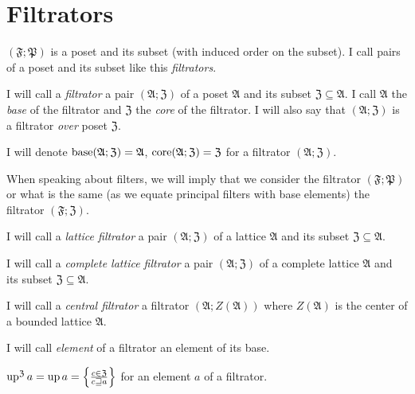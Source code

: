 \section{Filtrators}

$(\mathfrak{F};\mathfrak{P})$ is a poset and its subset (with induced
order on the subset). I call pairs of a poset and its subset like
this \emph{filtrators}.
\begin{defn}
I will call a \emph{filtrator} a pair $(\mathfrak{A};\mathfrak{Z})$
of a poset $\mathfrak{A}$ and its subset $\mathfrak{Z}\subseteq\mathfrak{A}$.
I call $\mathfrak{A}$ the \emph{base} of the filtrator and $\mathfrak{Z}$
the \emph{core} of the filtrator. I will also say that $(\mathfrak{A};\mathfrak{Z})$
is a filtrator \emph{over} poset $\mathfrak{Z}$.

I will denote $\operatorname{base}(\mathfrak{A};\mathfrak{Z})=\mathfrak{A}$, $\operatorname{core}(\mathfrak{A};\mathfrak{Z})=\mathfrak{Z}$
for a filtrator $(\mathfrak{A};\mathfrak{Z})$.
\end{defn}
When speaking about filters, we will imply that we consider the filtrator
$(\mathfrak{F};\mathfrak{P})$ or what is the same (as we equate principal
filters with base elements) the filtrator $(\mathfrak{F};\mathfrak{Z})$.


\begin{defn}
I will call a \emph{lattice filtrator} a
pair $(\mathfrak{A};\mathfrak{Z})$ of a lattice $\mathfrak{A}$ and
its subset $\mathfrak{Z}\subseteq\mathfrak{A}$.
\end{defn}

\begin{defn}
I will call a \emph{complete lattice
filtrator} a pair $(\mathfrak{A};\mathfrak{Z})$ of a complete lattice
$\mathfrak{A}$ and its subset $\mathfrak{Z}\subseteq\mathfrak{A}$.
\end{defn}

\begin{defn}
I will call a \emph{central filtrator} a
filtrator $(\mathfrak{A};Z(\mathfrak{A}))$ where $Z(\mathfrak{A})$
is the center of a bounded lattice $\mathfrak{A}$.
\end{defn}

\begin{defn}
I will call \emph{element} of a filtrator
an element of its base.
\end{defn}

\begin{defn}
$\operatorname{up}^{\mathfrak{Z}}a=\operatorname{up} a=\left\{ \frac{c\in\mathfrak{Z}}{c\sqsupseteq a}\right\}$
for an element $a$ of a filtrator.
\end{defn}

